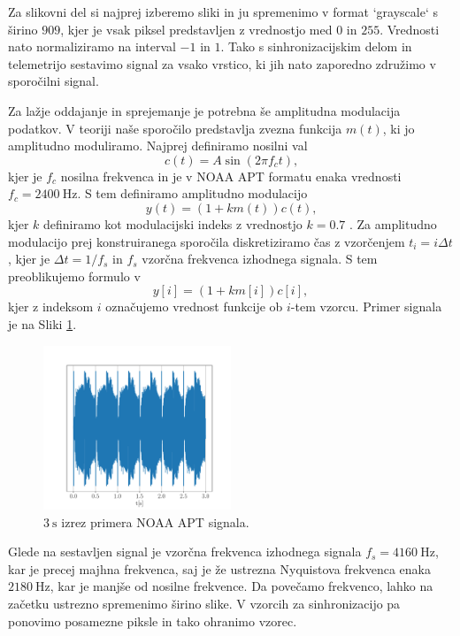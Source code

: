 \documentclass{article}
\begin{document}
Za slikovni del si najprej izberemo sliki in ju spremenimo v format `grayscale` s širino $909$, kjer je vsak piksel predstavljen z vrednostjo med $0$ in $255$. Vrednosti nato normaliziramo na interval $-1$ in $1$. Tako s sinhronizacijskim delom in telemetrijo sestavimo signal za vsako vrstico, ki jih nato zaporedno združimo v sporočilni signal.

Za lažje oddajanje in sprejemanje je potrebna še amplitudna modulacija podatkov. V teoriji naše sporočilo predstavlja zvezna funkcija $m(t)$, ki jo amplitudno moduliramo. Najprej definiramo nosilni val
\begin{equation*}
	c(t) = A \sin{(2\pi f_c t)}\text{,}
\end{equation*}
kjer je $f_c$ nosilna frekvenca in je v NOAA APT formatu enaka vrednosti $f_c=\SI{2400}{\hertz}$. S tem definiramo amplitudno modulacijo 
\begin{equation*}
	y(t) = (1 + km(t))c(t)\text{,}
\end{equation*}
kjer $k$ definiramo kot modulacijski indeks z vrednostjo $k=0.7$ \cite{am_wiki}. Za amplitudno modulacijo prej konstruiranega sporočila diskretiziramo čas z vzorčenjem $t_i=i\Delta t$, kjer je $\Delta t = 1 / f_s$ in $f_s$ vzorčna frekvenca izhodnega signala. S tem preoblikujemo formulo v 
\begin{equation*}
	y[i] = (1 + km[i])c[i],
\end{equation*}
kjer z indeksom $i$ označujemo vrednost funkcije ob $i$-tem vzorcu. Primer signala je na Sliki \ref{fig:signal_example}. 
\begin{figure}[H]
    \centering
    \includegraphics[width=0.5\textwidth]{signal_example.pdf}
    \caption{$\SI{3}{\second}$ izrez primera NOAA APT signala.}
    \label{fig:signal_example}
\end{figure}
Glede na sestavljen signal je vzorčna frekvenca izhodnega signala $f_s=\SI{4160}{\hertz}$, kar je precej majhna frekvenca, saj je že ustrezna Nyquistova frekvenca enaka $\SI{2180}{\hertz}$, kar je manjše od nosilne frekvence. Da povečamo frekvenco, lahko na začetku ustrezno spremenimo širino slike. V vzorcih za sinhronizacijo pa ponovimo posamezne piksle in tako ohranimo vzorec. 
\end{document}
